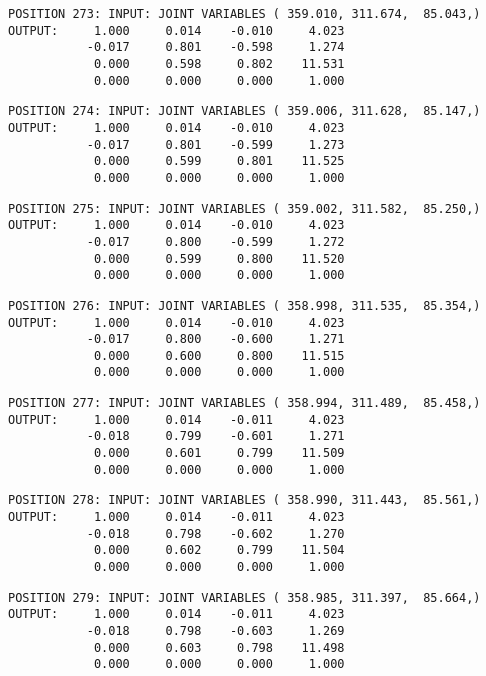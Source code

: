 \begin{verbatim}
POSITION 273: INPUT: JOINT VARIABLES ( 359.010, 311.674,  85.043,)
OUTPUT:     1.000     0.014    -0.010     4.023
           -0.017     0.801    -0.598     1.274
            0.000     0.598     0.802    11.531
            0.000     0.000     0.000     1.000
\end{verbatim} \pagebreak[1]\begin{verbatim}
POSITION 274: INPUT: JOINT VARIABLES ( 359.006, 311.628,  85.147,)
OUTPUT:     1.000     0.014    -0.010     4.023
           -0.017     0.801    -0.599     1.273
            0.000     0.599     0.801    11.525
            0.000     0.000     0.000     1.000
\end{verbatim} \pagebreak[1]\begin{verbatim}
POSITION 275: INPUT: JOINT VARIABLES ( 359.002, 311.582,  85.250,)
OUTPUT:     1.000     0.014    -0.010     4.023
           -0.017     0.800    -0.599     1.272
            0.000     0.599     0.800    11.520
            0.000     0.000     0.000     1.000
\end{verbatim} \pagebreak[1]\begin{verbatim}
POSITION 276: INPUT: JOINT VARIABLES ( 358.998, 311.535,  85.354,)
OUTPUT:     1.000     0.014    -0.010     4.023
           -0.017     0.800    -0.600     1.271
            0.000     0.600     0.800    11.515
            0.000     0.000     0.000     1.000
\end{verbatim} \pagebreak[1]\begin{verbatim}
POSITION 277: INPUT: JOINT VARIABLES ( 358.994, 311.489,  85.458,)
OUTPUT:     1.000     0.014    -0.011     4.023
           -0.018     0.799    -0.601     1.271
            0.000     0.601     0.799    11.509
            0.000     0.000     0.000     1.000
\end{verbatim} \pagebreak[1]\begin{verbatim}
POSITION 278: INPUT: JOINT VARIABLES ( 358.990, 311.443,  85.561,)
OUTPUT:     1.000     0.014    -0.011     4.023
           -0.018     0.798    -0.602     1.270
            0.000     0.602     0.799    11.504
            0.000     0.000     0.000     1.000
\end{verbatim} \pagebreak[1]\begin{verbatim}
POSITION 279: INPUT: JOINT VARIABLES ( 358.985, 311.397,  85.664,)
OUTPUT:     1.000     0.014    -0.011     4.023
           -0.018     0.798    -0.603     1.269
            0.000     0.603     0.798    11.498
            0.000     0.000     0.000     1.000
\end{verbatim} \pagebreak[1]\begin{verbatim}

\end{verbatim}

